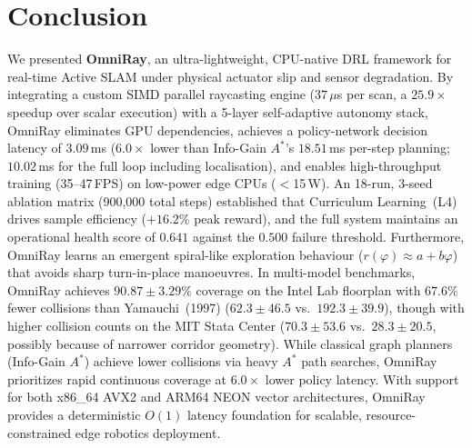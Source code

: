 \documentclass[conference]{IEEEtran}
\begin{document}
\section{Conclusion}
We presented \textbf{OmniRay}, an ultra-lightweight, CPU-native DRL framework for real-time Active SLAM under physical actuator slip and sensor degradation.
By integrating a custom SIMD parallel raycasting engine ($37\,\mu$s per scan, a $25.9\times$ speedup over scalar execution) with a 5-layer self-adaptive autonomy stack, OmniRay eliminates GPU dependencies, achieves a policy-network decision latency of $3.09$\,ms ($6.0\times$ lower than Info-Gain $A^*$'s $18.51$\,ms per-step planning; $10.02$\,ms for the full loop including localisation), and enables high-throughput training (35--47\,FPS) on low-power edge CPUs ($<$15\,W).
An 18-run, 3-seed ablation matrix (900{,}000 total steps) established that Curriculum Learning~(L4) drives sample efficiency ($+16.2\%$ peak reward), and the full system maintains an operational health score of $0.641$ against the $0.500$ failure threshold.
Furthermore, OmniRay learns an emergent spiral-like exploration behaviour ($r(\varphi) \approx a + b\varphi$) that avoids sharp turn-in-place manoeuvres.
In multi-model benchmarks, OmniRay achieves $90.87 \pm 3.29\%$ coverage on the Intel Lab floorplan with $67.6\%$ fewer collisions than Yamauchi~(1997) ($62.3 \pm 46.5$ vs.\ $192.3 \pm 39.9$), though with higher collision counts on the MIT Stata Center ($70.3 \pm 53.6$ vs.\ $28.3 \pm 20.5$, possibly because of narrower corridor geometry). While classical graph planners (Info-Gain $A^*$) achieve lower collisions via heavy $A^*$ path searches, OmniRay prioritizes rapid continuous coverage at $6.0\times$ lower policy latency.
With support for both x86\_64 AVX2 and ARM64 NEON vector architectures, OmniRay provides a deterministic $O(1)$ latency foundation for scalable, resource-constrained edge robotics deployment.
\end{document}

